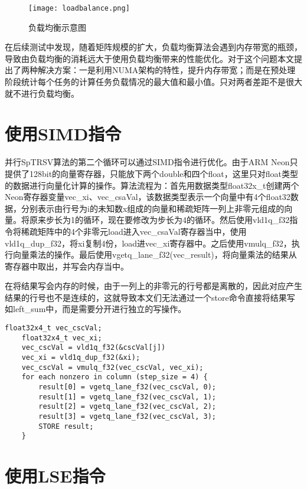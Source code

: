 \begin{figure}[htbp]
    \centering
    \texttt{[image: loadbalance.png]}
    \caption{负载均衡示意图}
    \label{负载均衡示意图}
\end{figure}

在后续测试中发现，随着矩阵规模的扩大，负载均衡算法会遇到内存带宽的瓶颈，导致由负载均衡的消耗远大于使用负载均衡带来的性能优化。对于这个问题本文提出了两种解决方案：一是利用NUMA架构的特性，提升内存带宽；而是在预处理阶段统计每个任务的计算任务负载情况的最大值和最小值。只对两者差距不是很大就不进行负载均衡。


\section{使用SIMD指令}

并行SpTRSV算法的第二个循环可以通过SIMD指令进行优化。由于ARM Neon只提供了128bit的向量寄存器，只能放下两个double和四个float，这里只对float类型的数据进行向量化计算的操作。算法流程为：首先用数据类型float32x\_t创建两个Neon寄存器变量vec\_xi、vec\_csaVal，该数据类型表示一个向量中有4个float32数据，分别表示由行号为i的未知数x组成的向量和稀疏矩阵一列上非零元组成的向量。将原来步长为1的循环，现在要修改为步长为4的循环。然后使用vld1q\_f32指令将稀疏矩阵中的4个非零元load进入vec\_csaVal寄存器当中，使用vld1q\_dup\_f32，将xi复制4份，load进vec\_xi寄存器中。之后使用vmulq\_f32，执行向量乘法的操作。最后使用vgetq\_lane\_f32(vec\_result)，将向量乘法的结果从寄存器中取出，并写会内存当中。

在将结果写会内存的时候，由于一列上的非零元的行号都是离散的，因此对应产生结果的行号也不是连续的，这就导致本文们无法通过一个store命令直接将结果写如left\_sum中，而是需要分开进行独立的写操作。

\begin{lstlisting}[caption={SIMD指令优化}]
    float32x4_t vec_cscVal;
    float32x4_t vec_xi;
    vec_cscVal = vld1q_f32(&cscVal[j])
    vec_xi = vld1q_dup_f32(&xi);
    vec_cscVal = vmulq_f32(vec_cscVal, vec_xi);
    for each nonzero in column (step_size = 4) {
        result[0] = vgetq_lane_f32(vec_cscVal, 0);
        result[1] = vgetq_lane_f32(vec_cscVal, 1);
        result[2] = vgetq_lane_f32(vec_cscVal, 2);
        result[3] = vgetq_lane_f32(vec_cscVal, 3);
        STORE result;
    }
\end{lstlisting}

\section{使用LSE指令}

